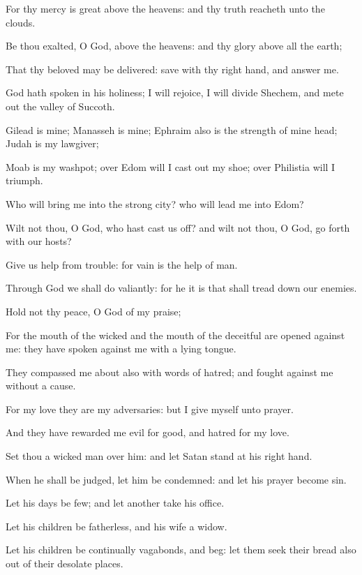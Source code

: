 \Verse For thy mercy is great above the heavens: and thy truth reacheth unto the clouds.

\Verse Be thou exalted, O God, above the heavens: and thy glory above all the earth;

\Verse That thy beloved may be delivered: save with thy right hand, and answer me.

\Verse God hath spoken in his holiness; I will rejoice, I will divide Shechem, and mete out the valley of Succoth.

\Verse Gilead is mine; Manasseh is mine; Ephraim also is the strength of mine head; Judah is my lawgiver;

\Verse Moab is my washpot; over Edom will I cast out my shoe; over Philistia will I triumph.

\Verse Who will bring me into the strong city? who will lead me into Edom?

\Verse Wilt not thou, O God, who hast cast us off? and wilt not thou, O God, go forth with our hosts?

\Verse Give us help from trouble: for vain is the help of man.

\Verse Through God we shall do valiantly: for he it is that shall tread down our enemies.




\Chapter
\Verse Hold not thy peace, O God of my praise;

\Verse For the mouth of the wicked and the mouth of the deceitful are opened against me: they have spoken against me with a lying tongue.

\Verse They compassed me about also with words of hatred; and fought against me without a cause.

\Verse For my love they are my adversaries: but I give myself unto prayer.

\Verse And they have rewarded me evil for good, and hatred for my love.

\Verse Set thou a wicked man over him: and let Satan stand at his right hand.

\Verse When he shall be judged, let him be condemned: and let his prayer become sin.

\Verse Let his days be few; and let another take his office.

\Verse Let his children be fatherless, and his wife a widow.

\Verse Let his children be continually vagabonds, and beg: let them seek their bread also out of their desolate places.

